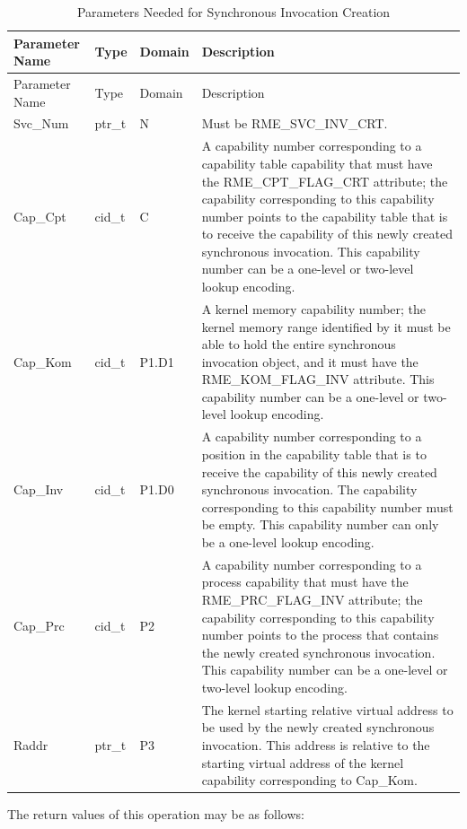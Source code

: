 \begin{xltabular}{\textwidth}{@{}>{\hsize\raggedright\arraybackslash}X>{\hsize\raggedright\arraybackslash}X>{\hsize\raggedright\arraybackslash}X>{\hsize\raggedright\arraybackslash}X@{}}
\caption{Parameters Needed for Synchronous Invocation Creation}\label{tab:5-4-create-sync-invocation-parameters}\\
\toprule
Parameter Name & Type & Domain & Description\tabularnewline
\endfirsthead
\toprule
Parameter Name & Type & Domain & Description\tabularnewline
\midrule
\endhead
\bottomrule
\endlastfoot
Svc\_Num & ptr\_t & N & Must be RME\_SVC\_INV\_CRT.\tabularnewline
Cap\_Cpt & cid\_t & C &
A capability number corresponding to a capability table capability that must have the RME\_CPT\_FLAG\_CRT attribute; the capability corresponding to this capability number points to the capability table that is to receive the capability of this newly created synchronous invocation. This capability number can be a one-level or two-level lookup encoding.\tabularnewline
Cap\_Kom & cid\_t & P1.D1 &
A kernel memory capability number; the kernel memory range identified by it must be able to hold the entire synchronous invocation object, and it must have the RME\_KOM\_FLAG\_INV attribute. This capability number can be a one-level or two-level lookup encoding.\tabularnewline
Cap\_Inv & cid\_t & P1.D0 &
A capability number corresponding to a position in the capability table that is to receive the capability of this newly created synchronous invocation. The capability corresponding to this capability number must be empty. This capability number can only be a one-level lookup encoding.\tabularnewline
Cap\_Prc & cid\_t & P2 &
A capability number corresponding to a process capability that must have the RME\_PRC\_FLAG\_INV attribute; the capability corresponding to this capability number points to the process that contains the newly created synchronous invocation. This capability number can be a one-level or two-level lookup encoding.\tabularnewline
Raddr & ptr\_t & P3 &
The kernel starting relative virtual address to be used by the newly created synchronous invocation. This address is relative to the starting virtual address of the kernel capability corresponding to Cap\_Kom.\tabularnewline
\end{xltabular}
\nopagebreak[4]

The return values of this operation may be as follows:

